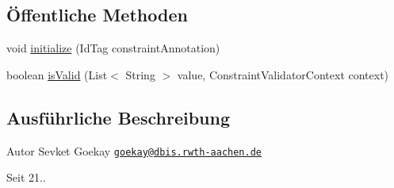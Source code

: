 \subsection*{Öffentliche Methoden}
\begin{DoxyCompactItemize}
\item 
void \hyperlink{classde_1_1rwth_1_1idsg_1_1steve_1_1web_1_1validation_1_1_id_tag_list_validator_a5192f6897afc0aaf282f5a67f14e6e2d}{initialize} (Id\+Tag constraint\+Annotation)
\item 
boolean \hyperlink{classde_1_1rwth_1_1idsg_1_1steve_1_1web_1_1validation_1_1_id_tag_list_validator_a952fb5b36fbd18558318c810d877a3cb}{is\+Valid} (List$<$ String $>$ value, Constraint\+Validator\+Context context)
\end{DoxyCompactItemize}


\subsection{Ausführliche Beschreibung}
\begin{DoxyAuthor}{Autor}
Sevket Goekay \href{mailto:goekay@dbis.rwth-aachen.de}{\tt goekay@dbis.\+rwth-\/aachen.\+de} 
\end{DoxyAuthor}
\begin{DoxySince}{Seit}
21.. 
\end{DoxySince}


